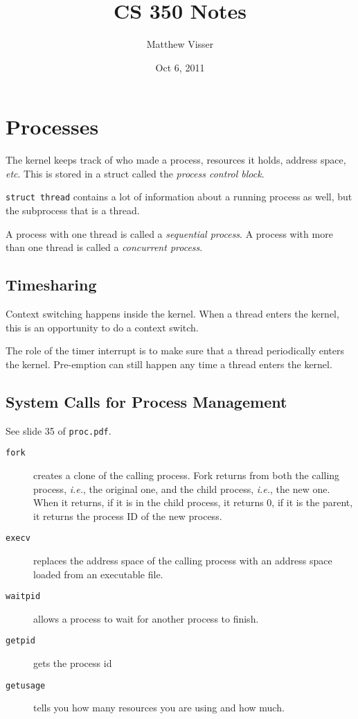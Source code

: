 \documentclass[12pt]{article}
\begin{document}
\title{CS 350 Notes}
\author{Matthew Visser}
\date{Oct  6, 2011}
\maketitle

\section{Processes}

The kernel keeps track of who made a process, resources it holds, address space,
\textit{etc}. This is stored in a struct called the \emph{process control
block}.

\texttt{struct thread} contains a lot of information about a running process as
well, but the subprocess that is a thread.

A process with one thread is called a \emph{sequential process}. A process with
more than one thread is called a \emph{concurrent process}.

\subsection{Timesharing}

Context switching happens inside the kernel. When a thread enters the kernel,
this is an opportunity to do a context switch.

The role of the timer interrupt is to make sure that a thread periodically
enters the kernel. Pre-emption can still happen any time a thread enters the
kernel.


\subsection{System Calls for Process Management}

See slide 35 of \texttt{proc.pdf}.

\begin{description}
	\item[\texttt{fork}] creates a clone of the calling process. Fork returns
		from both the calling process, \textit{i.e.}, the original one, and the
		child process, \textit{i.e.}, the new one. When it returns, if it is in
		the child process, it returns 0, if it is the parent, it returns the
		process ID of the new process.
	\item[\texttt{execv}] replaces the address space of the calling process with
		an address space loaded from an executable file.
	\item[\texttt{waitpid}] allows a process to wait for another process to
		finish.
	\item[\texttt{getpid}] gets the process id
	\item[\texttt{getusage}] tells you how many resources you are using and how
		much.
\end{description}
\end{document}
